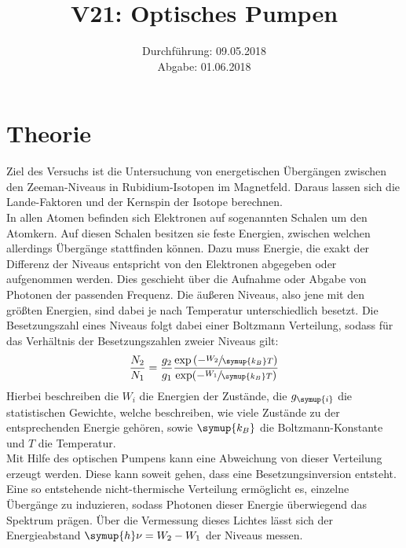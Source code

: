 \documentclass[
  bibliography=totoc,     %
  captions=tableheading,  %
  titlepage=firstiscover, %
]{scrartcl}
\title{V21: Optisches Pumpen}
\author{
  Simon Schulte
  \texorpdfstring{
    \\
    \href{mailto:simon.schulte@udo.edu}{simon.schulte@udo.edu}
  }{}
  \texorpdfstring{\and}{, }
  Tim Sedlaczek
  \texorpdfstring{
    \\
    \href{mailto:tim.sedlaczek@udo.edu}{tim.sedlaczek@udo.edu}
  }{}
}
\date{Durchführung: 09.05.2018\\
      Abgabe: 01.06.2018}
\begin{document}
\maketitle
\thispagestyle{empty}
\setcounter{page}{1}
\section{Theorie}
\label{sec:theorie}
Ziel des Versuchs ist die Untersuchung von energetischen Übergängen zwischen den
Zeeman-Niveaus in Rubidium-Isotopen im Magnetfeld. Daraus lassen sich die
Lande-Faktoren und der Kernspin der Isotope berechnen. \\
In allen Atomen befinden sich Elektronen auf sogenannten Schalen um den
Atomkern. Auf diesen Schalen besitzen sie feste Energien, zwischen welchen
allerdings Übergänge stattfinden können. Dazu muss Energie, die exakt der
Differenz der Niveaus entspricht von den Elektronen abgegeben oder aufgenommen
werden. Dies geschieht über die Aufnahme oder Abgabe von Photonen der
passenden Frequenz. Die äußeren Niveaus, also jene mit den größten Energien,
sind dabei je nach Temperatur unterschiedlich besetzt. Die Besetzungszahl eines
Niveaus folgt dabei einer Boltzmann Verteilung, sodass für das Verhältnis der
Besetzungszahlen zweier Niveaus gilt:
%
\begin{equation}
  \frac{N_2}{N_1}=\frac{g_2}{g_1}\frac{\exp\left(-\sfrac{W_2}{\symup{k_B}T}\right)}{\exp(-\sfrac{W_1}{\symup{k_B}T})}
\end{equation}
%
Hierbei beschreiben die $W_i$ die Energien der Zustände, die $g_{\symup{i}}$ die
statistischen Gewichte, welche beschreiben, wie viele Zustände zu der entsprechenden
Energie gehören, sowie $\symup{k_B}$ die Boltzmann-Konstante und $T$ die
Temperatur. \\
Mit Hilfe des optischen Pumpens kann eine Abweichung von dieser Verteilung
erzeugt werden. Diese kann soweit gehen, dass eine Besetzungsinversion
entsteht. Eine so entstehende nicht-thermische Verteilung ermöglicht es,
einzelne Übergänge zu induzieren, sodass Photonen dieser Energie überwiegend
das Spektrum prägen. Über die Vermessung dieses Lichtes lässt sich der
Energieabstand $\symup{h}\nu=W_2-W_1$ der Niveaus messen.
\end{document}
